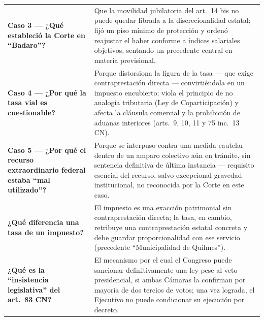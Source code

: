 \documentclass[12pt,oneside]{book}
\begin{document}
\begin{longtable}{
    >{\raggedright\arraybackslash}p{}
    >{\raggedright\arraybackslash}p{}
}
\textbf{Caso 3 --- ¿Qué estableció la Corte en ``Badaro''?} &
Que la movilidad jubilatoria del art.\ 14 bis no puede quedar librada a la discrecionalidad estatal; fijó un piso mínimo de protección y ordenó reajustar el haber conforme a índices salariales objetivos, sentando un precedente central en materia previsional. \\

\textbf{Caso 4 --- ¿Por qué la tasa vial es cuestionable?} &
Porque distorsiona la figura de la tasa --- que exige contraprestación directa --- convirtiéndola en un impuesto encubierto; viola el principio de no analogía tributaria (Ley de Coparticipación) y afecta la cláusula comercial y la prohibición de aduanas interiores (arts.\ 9, 10, 11 y 75 inc.\ 13 CN). \\

\textbf{Caso 5 --- ¿Por qué el recurso extraordinario federal estaba ``mal utilizado''?} &
Porque se interpuso contra una medida cautelar dentro de un amparo colectivo aún en trámite, sin sentencia definitiva de última instancia --- requisito esencial del recurso, salvo excepcional gravedad institucional, no reconocida por la Corte en este caso. \\

\textbf{¿Qué diferencia una tasa de un impuesto?} &
El impuesto es una exacción patrimonial sin contraprestación directa; la tasa, en cambio, retribuye una contraprestación estatal concreta y debe guardar proporcionalidad con ese servicio (precedente ``Municipalidad de Quilmes''). \\

\textbf{¿Qué es la ``insistencia legislativa'' del art.\ 83 CN?} &
El mecanismo por el cual el Congreso puede sancionar definitivamente una ley pese al veto presidencial, si ambas Cámaras la confirman por mayoría de dos tercios de votos; una vez lograda, el Ejecutivo no puede condicionar su ejecución por decreto. \\

\midrule


\end{longtable}
\end{document}
